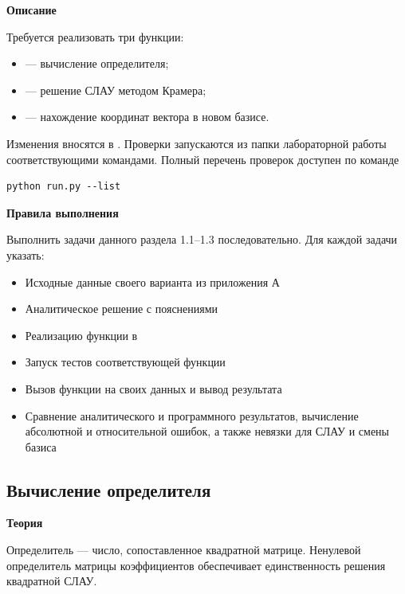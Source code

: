 \documentclass[12pt,a4paper]{article}
\newcommand{\micro}[1]{\subsection{#1}}
\newcommand{\taskhead}[1]{\par\textbf{#1}\par}
\begin{document}
\taskhead{Описание}
Требуется реализовать три функции:
\begin{itemize}
\item {} --- вычисление определителя;
\item {} --- решение СЛАУ методом Крамера;
\item {} --- нахождение координат вектора в новом базисе.
\end{itemize}
Изменения вносятся в .
Проверки запускаются из папки лабораторной работы соответствующими командами.
Полный перечень проверок доступен по команде 

\begin{lstlisting}[style=commands]
python run.py --list
\end{lstlisting}

\taskhead{Правила выполнения}
Выполнить задачи данного раздела 1.1--1.3 последовательно. Для каждой задачи указать:

\begin{itemize}
  \item Исходные данные своего варианта из приложения А
  \item Аналитическое решение с пояснениями
  \item Реализацию функции в 
  \item Запуск тестов соответствующей функции
  \item Вызов функции на своих данных и вывод результата
  \item Сравнение аналитического и программного результатов, вычисление абсолютной и относительной ошибок, а также невязки для СЛАУ и смены базиса
\end{itemize}

\micro{Вычисление определителя}
\taskhead{Теория}

Определитель --- число, сопоставленное квадратной матрице. Ненулевой
определитель матрицы коэффициентов обеспечивает единственность решения
квадратной СЛАУ. 
\end{document}
